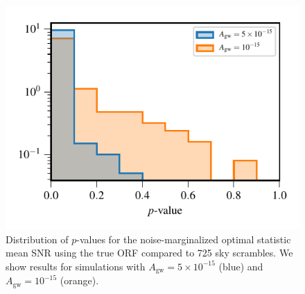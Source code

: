 \documentclass[twocolumn,aps,prd,superscriptaddress]{revtex4-1}
\newcommand{\Agw}{\ensuremath{A_\mathrm{gw}}}
\begin{document}
\begin{figure}[tb]
	\includegraphics[width=0.9\columnwidth]{plots/optstat_scrambled.pdf}
	\caption{Distribution of $p$-values for the noise-marginalized optimal statistic mean SNR 
			using the true ORF compared to 725 sky scrambles. 
			We show results for simulations with $\Agw=5\times10^{-15}$ (blue) and $\Agw=10^{-15}$ (orange).}
	\label{fig:skyscrambles_pvalues}
\end{figure}


\end{document}

